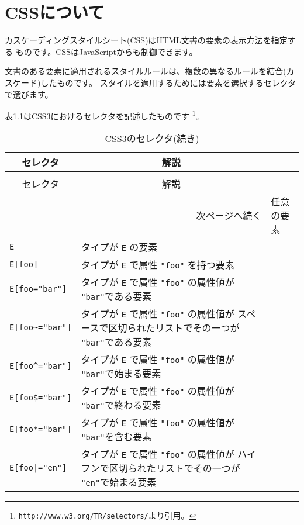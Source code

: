 \chapter{CSSについて}\label{CSSdefs}
カスケーディングスタイルシート(CSS)はHTML文書の要素の表示方法を指定する
ものです。CSSはJavaScriptからも制御できます。

文書のある要素に適用されるスタイルルールは、複数の異なるルールを結合(カ
スケード)したものです。
スタイルを適用するためには要素を選択するセレクタで選びます。

表\ref{CSS3selector}はCSS3におけるセレクタを記述したものです
\footnote{\protect\texttt{http://www.w3.org/TR/selectors/}より引用。}。
\begin{longtable}{|m{13em}|m{}|}
 \caption{CSS3のセレクタ}\label{CSS3selector}\\
\hline
\multicolumn{1}{|c|}{セレクタ}&\multicolumn{1}{c|}{解説}\\\hline
\endfirsthead
 \caption{CSS3のセレクタ(続き)}\\
\hline
\multicolumn{1}{|c|}{セレクタ}&\multicolumn{1}{c|}{解説}\\\hline
\endhead
\multicolumn{2}{r}{次ページへ続く}
\endfoot
\hline
\endlastfoot
\verb+*+&任意の要素%
\\\hline
\verb+E+&タイプが \verb+E+ の要素%
\\\hline
\verb+E[foo]+&タイプが \verb+E+ で属性 \verb+"foo"+ を持つ要素%
\\\hline
\verb+E[foo="bar"]+&タイプが \verb+E+ で属性 \verb+"foo"+ の属性値が
     \verb+"bar"+である要素%
\\\hline
\verb+E[foo~="bar"]+&タイプが \verb+E+ で属性 \verb+"foo"+ の属性値が
     スペースで区切られたリストでその一つが \verb+"bar"+である要素%
\\\hline
\verb+E[foo^="bar"]+&タイプが \verb+E+ で属性 \verb+"foo"+ の属性値が
     \verb+"bar"+で始まる要素
\\\hline
\verb+E[foo$="bar"]+&タイプが \verb+E+ で属性 \verb+"foo"+ の属性値が
     \verb+"bar"+で終わる要素%
\\\hline
\verb+E[foo*="bar"]+&タイプが \verb+E+ で属性 \verb+"foo"+ の属性値が
     \verb+"bar"+を含む要素%
\\\hline
\verb+E[foo|="en"]+&タイプが \verb+E+ で属性 \verb+"foo"+ の属性値が
     ハイフンで区切られたリストでその一つが \verb+"en"+で始まる要素

\end{longtable}
